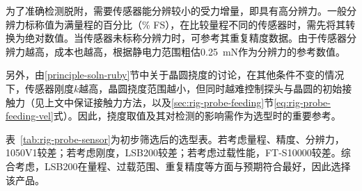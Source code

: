 为了准确检测脱附，需要传感器能分辨较小的受力增量，即具有高分辨力。一般分辨力标称值为满量程的百分比（\% FS），在比较量程不同的传感器时，需先将其转换为绝对数值。当传感器未标称分辨力时，可参考其重复精度数据。由于传感器分辨力越高，成本也越高，根据静电力范围粗估\SI{0.25}{\milli\newton}作为分辨力的参考数值。%

另外，由\ref{principle-soln-ruby}节中关于晶圆挠度的讨论，在其他条件不变的情况下，传感器刚度$k$越高，晶圆挠度范围越小，但同时越难控制探头与晶圆的初始接触力（见上文中保证接触力方法，以及\ref{sec:rig-probe-feeding}节\eqref{eq:rig-probe-feeding-vel}式）。因此，挠度取值及其对检测的影响需作为选型时的重要参考。

表~\ref{tab:rig-probe-sensor}为初步筛选后的选型表。若考虑量程、精度、分辨力，1050V1较差；若考虑刚度，LSB200较差；若考虑过载性能，FT-S10000较差。综合考虑，LSB200在量程、过载范围、重复精度等方面与预期符合最好，因此选择该产品。

